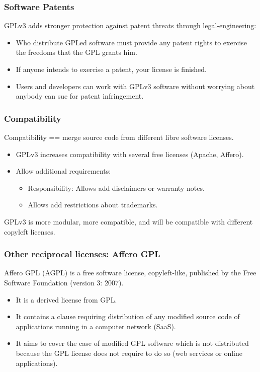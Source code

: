 
\begin{frame}
\frametitle{Software Patents}
GPLv3 adds stronger protection against patent threats through legal-engineering:

\begin{itemize}
\item Who distribute GPLed software must provide any patent rights to exercise the freedoms that the GPL grants him.
\item If anyone intends to exercise a patent, your license is finished.
\item Users and developers can work with GPLv3 software without worrying about anybody can sue for patent infringement.
\end{itemize}


\end{frame}


\begin{frame}
\frametitle{Compatibility}

Compatibility == merge source code from different libre software licenses.

\begin{itemize}
\item GPLv3 increases compatibility with several free licenses (Apache, Affero).
\item Allow additional requirements:
\begin{itemize}
\item Responsibility: Allows add disclaimers or warranty notes.
\item Allows add restrictions about trademarks.
\end{itemize}
\end{itemize}

GPLv3 is more modular, more compatible, and will be compatible with different copyleft licenses.

\end{frame}


\begin{frame}
\frametitle{Other reciprocal licenses: Affero GPL}

Affero GPL (AGPL) is a free software license, copyleft-like, published by the Free Software Foundation (version 3: 2007). 

\begin{itemize}
\item It is a derived license from GPL. 
\item It contains a clause requiring distribution of any modified source code of applications running in a computer network (SaaS).
\item It aims to cover the case of modified GPL software which is not distributed because the GPL license does not require to do so (web services or online applications). 
\end{itemize}
\end{frame}


